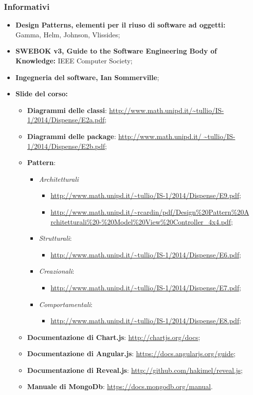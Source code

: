 \subsubsection{Informativi}
	\begin{itemize}
		\item \textbf{Design Patterns, elementi per il riuso di software ad oggetti: } Gamma,  Helm,  Johnson,  Vlissides;
		\item \textbf{SWEBOK v3, Guide to the Software Engineering Body of Knowledge: } IEEE Computer Society;
		\item \textbf{Ingegneria del software, Ian Sommerville};
		\item \textbf{Slide del corso: }
				\begin{itemize}
					\item \textbf{Diagrammi delle classi}: \url{http://www.math.unipd.it/~tullio/IS-1/2014/Dispense/E2a.pdf};
					\item \textbf{Diagrammi delle package}: \url{http://www.math.unipd.it/ ~tullio/IS-1/2014/Dispense/E2b.pdf};
					\item \textbf{Pattern}:
					\begin{itemize}
						\item \textit{Architetturali}
							\begin{itemize}
								\item \url{http://www.math.unipd.it/~tullio/IS-1/2014/Dispense/E9.pdf}; 
								\item \url{http://www.math.unipd.it/~rcardin/pdf/Design\%20Pattern\%20Architetturali\%20-\%20Model\%20View\%20Controller\_4x4.pdf};
							\end{itemize}
						\item \textit{Strutturali}:
						\begin{itemize}
						\item \url{http://www.math.unipd.it/~tullio/IS-1/2014/Dispense/E6.pdf};
						\end{itemize}
						\item \textit{Creazionali}:
						\begin{itemize}
						\item \url{http://www.math.unipd.it/~tullio/IS-1/2014/Dispense/E7.pdf};
						\end{itemize}
						\item \textit{Comportamentali}:
						\begin{itemize}
						\item \url{http://www.math.unipd.it/~tullio/IS-1/2014/Dispense/E8.pdf};
						\end{itemize}
					\end{itemize}
					\item \textbf{Documentazione di Chart.js}: \url{http://chartjs.org/docs};
					\item \textbf{Documentazione di Angular.js}: \url{https://docs.angularjs.org/guide};
					\item \textbf{Documentazione di Reveal.js}: \url{http://github.com/hakimel/reveal.js};
					\item \textbf{Manuale di MongoDb}: \url{https://docs.mongodb.org/manual}.
				\end{itemize}

	\end{itemize}